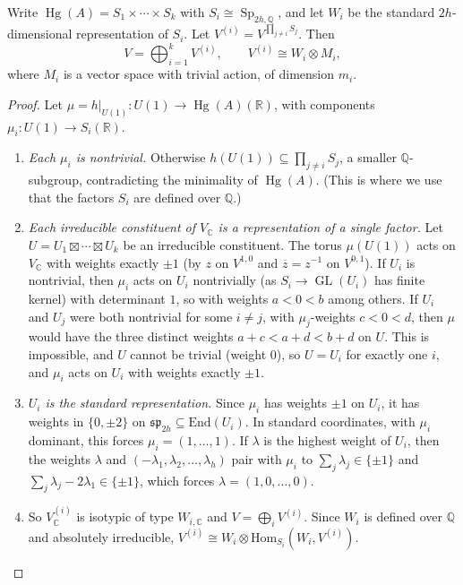 \documentclass[12pt]{amsart}
\newcommand{\R}{\mathbb{R}}
\newcommand{\Q}{\mathbb{Q}}
\newcommand{\C}{\mathbb{C}}
\newcommand{\End}{\text{End}}
\newcommand{\Hom}{\text{Hom}}
\DeclareMathOperator{\GL}{GL}
\DeclareMathOperator{\Sp}{Sp}
\DeclareMathOperator{\Hg}{Hg}
\newcommand{\fsp}{\mathfrak{sp}}
\newcommand{\ol}{\overline}
\theoremstyle{definition}
\theoremstyle{remark}
\numberwithin{equation}{section}
\begin{document}
\begin{lemma}\label{lem:rep}
    Write $\Hg(A) = S_1 \times \cdots \times S_k$ with $S_i \cong \Sp_{2h,\Q}$,
    and let $W_i$ be the standard $2h$-dimensional representation of $S_i$.
    Let $V^{(i)} = V^{\prod_{j \neq i} S_j}$. Then
    \begin{equation*}
        V = \bigoplus_{i=1}^k V^{(i)}, \qquad V^{(i)} \cong W_i \otimes M_i,
    \end{equation*}
    where $M_i$ is a vector space with trivial action, of dimension $m_i$.
\end{lemma}
\begin{proof}
    Let $\mu = h|_{U(1)} \colon U(1) \to \Hg(A)(\R)$, with components
    $\mu_i \colon U(1) \to S_i(\R)$.
    \begin{enumerate}[label=(\alph*)]
        \item \emph{Each $\mu_i$ is nontrivial.} Otherwise
        $h(U(1)) \subseteq \prod_{j \neq i} S_j$, a smaller $\Q$-subgroup,
        contradicting the minimality of $\Hg(A)$. (This is where we use that
        the factors $S_i$ are defined over $\Q$.)
        \item \emph{Each irreducible constituent of $V_\C$ is a representation
        of a single factor.} Let $U = U_1 \boxtimes \cdots \boxtimes U_k$ be an
        irreducible constituent. The torus $\mu(U(1))$ acts on $V_\C$ with
        weights exactly $\pm 1$ (by $z$ on $V^{1,0}$ and $\ol{z} = z^{-1}$ on
        $V^{0,1}$). If $U_i$ is nontrivial, then $\mu_i$ acts on $U_i$
        nontrivially (as $S_i \to \GL(U_i)$ has finite kernel) with
        determinant $1$, so with weights $a < 0 < b$ among others. If $U_i$
        and $U_j$ were both nontrivial for some $i \neq j$, with $\mu_j$-weights
        $c < 0 < d$, then $\mu$ would have the three distinct weights
        $a + c < a + d < b + d$ on $U$. This is impossible, and $U$ cannot be
        trivial (weight $0$), so $U = U_i$ for exactly one $i$, and $\mu_i$
        acts on $U_i$ with weights exactly $\pm 1$.
        \item \emph{$U_i$ is the standard representation.} Since $\mu_i$ has
        weights $\pm 1$ on $U_i$, it has weights in $\{0, \pm 2\}$ on
        $\fsp_{2h} \subseteq \End(U_i)$. In standard coordinates, with $\mu_i$
        dominant, this forces $\mu_i = (1, \ldots, 1)$. If $\lambda$ is the
        highest weight of $U_i$, then the weights $\lambda$ and
        $(-\lambda_1, \lambda_2, \ldots, \lambda_h)$ pair with $\mu_i$ to
        $\sum_j \lambda_j \in \{\pm 1\}$ and
        $\sum_j \lambda_j - 2\lambda_1 \in \{\pm 1\}$, which forces
        $\lambda = (1, 0, \ldots, 0)$.
        \item So $V^{(i)}_\C$ is isotypic of type $W_{i,\C}$ and
        $V = \bigoplus_i V^{(i)}$. Since $W_i$ is defined over $\Q$ and
        absolutely irreducible,
        $V^{(i)} \cong W_i \otimes \Hom_{S_i}(W_i, V^{(i)})$. \qedhere
    \end{enumerate}
\end{proof}
\end{document}
